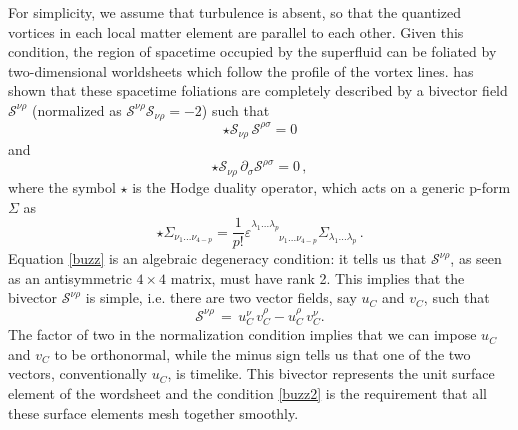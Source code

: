 \documentclass[usenatbib%
]{mnras}
\begin{document}
For simplicity, we assume that turbulence is absent, so that the quantized vortices in each local matter element are parallel to each other. Given this condition, the region of spacetime occupied by the superfluid can be foliated by two-dimensional worldsheets which follow the profile of the  vortex lines. 
\cite{Stachel1980} has shown that these spacetime foliations are completely described by a bivector field $\mathcal{S}^{\nu \rho}$ (normalized as $\mathcal{S}^{\nu \rho} \mathcal{S}_{\nu \rho} =-2 $) such that
\begin{equation}\label{buzz}
{\star}\mathcal{S}_{\nu \rho} \, \mathcal{S}^{\rho \sigma} = 0   
\end{equation} 
and 
\begin{equation}\label{buzz2}
{\star}\mathcal{S}_{\nu \rho} \, \partial_\sigma \mathcal{S}^{\rho \sigma} = 0 \, ,
\end{equation}
where the symbol ${\star}$ is the Hodge duality operator, which acts on a generic p-form $\Sigma$ as 
\begin{equation}\label{yogi}
{\star}\Sigma_{\nu_1 ... \nu_{4-p}} = 
\dfrac{1}{p!} \varepsilon^{ \lambda_1 ... \lambda_p}_{\phantom{\lambda_1 ... \lambda_p}\nu_1 ... \nu_{4-p}} 
\Sigma_{\lambda_1 ... \lambda_p} \, .
\end{equation}
Equation \eqref{buzz} is an algebraic degeneracy condition: it tells us that $\mathcal{S}^{\nu \rho}$, as seen as an antisymmetric $4\times 4$ matrix, must have rank 2. 
This implies that the bivector $\mathcal{S}^{\nu \rho}$ is simple, i.e. there are two vector fields, say $u_C$ and $v_C$, such that
\begin{equation}\label{bubu}
\mathcal{S}^{\nu \rho} \, = \, u_C^\nu \,  v_C^\rho - u_C^\rho \,  v_C^\nu .
\end{equation}
The factor of two in the normalization condition implies that we can impose $u_C$ and $v_C$ to be orthonormal, while the minus sign tells us that one of the two vectors, conventionally $u_C$, is timelike. 
This bivector represents the unit surface element of the wordsheet and the condition \eqref{buzz2} is the requirement that all these surface elements mesh together smoothly.
\end{document}
